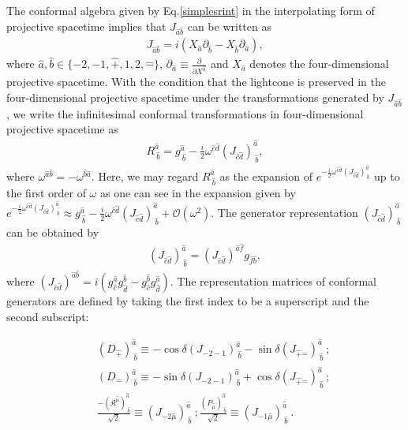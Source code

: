 \documentclass[%
 reprint,
superscriptaddress,
 amsmath,amssymb,
 aps,
]{revtex4-2}
\begin{document}
 The conformal algebra given by Eq.\eqref{simplesrint} in the interpolating form of projective spacetime implies that $J_{\hat{a}\hat{b}}$ can be written as
\begin{align}
    J_{\hat{a}\hat{b}}=i(X_{\hat{a}}\partial_{\hat{b}}-X_{\hat{b}}\partial_{\hat{a}}),
\end{align}
where $\hat{a},\hat{b}\in\{-2,-1,\hat{+},1,2,\hat{-}\}$, $\partial_{\hat{a}}\equiv\frac{\partial}{\partial X^{\hat{a}}}$ and $X_{\hat{a}}$ denotes the four-dimensional projective spacetime. With the condition that the lightcone is preserved in the four-dimensional projective spacetime under the transformations generated by $ J_{\hat{a}\hat{b}}$, we write the infinitesimal conformal transformations in four-dimensional projective spacetime as
\begin{align}
R^{\hat{a}}_{~\hat{b}}=g^{\hat{a}}_{~\hat{b}}-\frac{i}{2}\omega^{\hat{c}\hat{d}}(J_{\hat{c}\hat{d}})^{\hat{a}}_{~\hat{b}},\label{R_conformalTransformations}
\end{align}
where $\omega^{\hat{a}\hat{b}}=-\omega^{\hat{b}\hat{a}}$. Here, we may regard $R^{\hat{a}}_{~\hat{b}}$ as the expansion of $e^{-\frac{i}{2}\omega^{\hat{c}\hat{d}}(J_{\hat{c}\hat{d}})^{\hat{a}}_{~\hat{b}}}$ up to the first order of $\omega$ as one can see in the expansion given by 
$e^{-\frac{i}{2}\omega^{\hat{c}\hat{d}}(J_{\hat{c}\hat{d}})^{\hat{a}}_{~\hat{b}}} \approx  g^{\hat{a}}_{~\hat{b}}-\frac{i}{2}\omega^{\hat{c}\hat{d}}(J_{\hat{c}\hat{d}})^{\hat{a}}_{~\hat{b}}+\mathcal{O}(\omega^2)$.
The generator representation $(J_{\hat{c}\hat{d}})^{\hat{a}}_{~\hat{b}}$ can be obtained by
\begin{align}
    (J_{\hat{c}\hat{d}})^{\hat{a}}_{~\hat{b}}=(J_{\hat{c}\hat{d}})^{\hat{a}\hat{f}}g_{\hat{f}\hat{b}},
\end{align}
where $(J_{{\hat{c}}{\hat{d}}})^{{\hat{a}}{\hat{b}}}=i(g_{\hat{c}}^{\hat{a}} g_{\hat{d}}^{\hat{b}}-g_{\hat{c}}^{\hat{b}} g_{\hat{d}}^{\hat{a}})$. The representation matrices of conformal generators are defined by taking the first  index to be a superscript and the second subscript:

\begin{eqnarray}
    &&(D_{\hat{+}})^{\hat{a}}_{~\hat{b}}\equiv -\cos{\delta}(J_{-2-1})^{\hat{a}}_{~\hat{b}}-\sin{\delta}(J_{\hat{+}\hat{-}})^{\hat{a}}_{~\hat{b}}~;\nonumber\\
    &&(D_{\hat{-}})^{\hat{a}}_{~\hat{b}}\equiv -\sin{\delta}(J_{-2-1})^{\hat{a}}_{~\hat{b}}+\cos{\delta}(J_{\hat{+}\hat{-}})^{\hat{a}}_{~\hat{b}}~;\nonumber\\
    &&\frac{-(\mathfrak{K}^{\hat{\mu}})^{\hat{a}}_{~\hat{b}}}{\sqrt{2}}\equiv (J_{-2\hat{\mu}})^{\hat{a}}_{~\hat{b}}~;
    \frac{(P_{\hat{\mu}})^{\hat{a}}_{~\hat{b}}}{\sqrt{2}}\equiv (J_{-1\hat{\mu}})^{\hat{a}}_{~\hat{b}}~.
    \label{implicit6x6}
\end{eqnarray}
\end{document}
